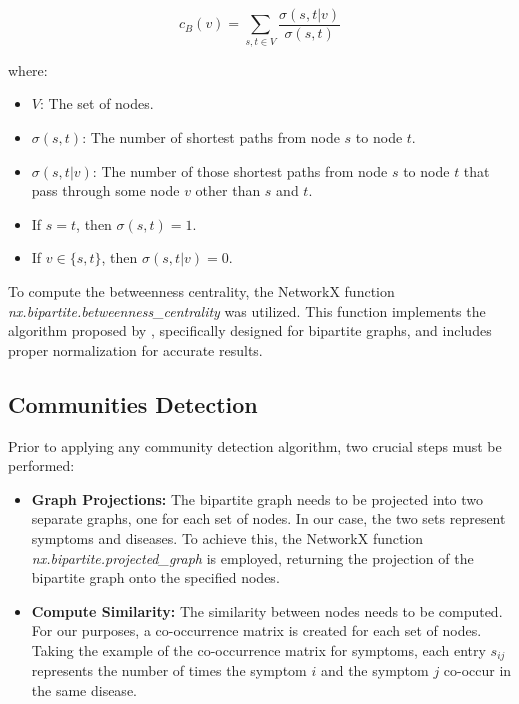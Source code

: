 \begin{equation}
    c_B(v) = \sum_{s,t \in V} \frac{\sigma(s, t|v)}{\sigma(s, t)} \label{eq:betweenness}
\end{equation}

where:

\begin{itemize}
    \setlength\itemsep{0.4em} %
    \item \(V\): The set of nodes.
    \item \(\sigma(s, t)\): The number of shortest paths from node \(s\) to node \(t\).
    \item \(\sigma(s, t|v)\): The number of those shortest paths from node \(s\) to node \(t\) that pass
          through some node \(v\) other than \(s\) and \(t\).
    \item If \(s = t\), then \(\sigma(s, t) = 1\).
    \item If \(v \in \{s, t\}\), then \(\sigma(s, t|v) = 0\).
\end{itemize}

To compute the betweenness centrality, the NetworkX function \textit{nx.bipartite.betweenness\_centrality}
was utilized. This function implements the algorithm proposed by  \cite{Brandes_2004},
specifically designed for bipartite graphs, and includes proper normalization for accurate results.

\subsection{Communities Detection}
Prior to applying any community detection algorithm, two crucial steps must be performed:\\


\begin{itemize}
    \setlength\itemsep{1em} %
    \item \textbf{Graph Projections:} The bipartite graph needs to be projected into two separate graphs,
          one for each set of nodes. In our case, the two sets represent symptoms and diseases. To achieve this,
          the NetworkX function \textit{nx.bipartite.projected\_graph} is employed, returning the projection of
          the bipartite graph onto the specified nodes.

    \item \textbf{Compute Similarity:} The similarity between nodes needs to be computed. For our purposes,
          a co-occurrence matrix is created for each set of nodes. Taking the example of the co-occurrence matrix
          for symptoms, each entry \(s_{ij}\) represents the number of times the symptom \(i\) and the symptom \(j\)
          co-occur in the same disease.
\end{itemize}
\vspace{0.4cm}


